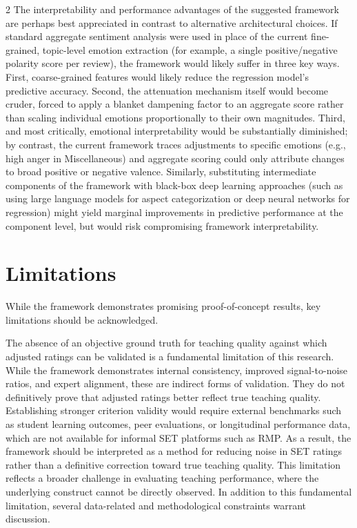 \documentclass{article}
\begin{document}
\begin{multicols*}{2}
The interpretability and performance advantages of the suggested framework are perhaps best appreciated in contrast to alternative architectural choices. If standard aggregate sentiment analysis were used in place of the current fine-grained, topic-level emotion extraction (for example, a single positive/negative polarity score per review), the framework would likely suffer in three key ways. First, coarse-grained features would likely reduce the regression model's predictive accuracy. Second, the attenuation mechanism itself would become cruder, forced to apply a blanket dampening factor to an aggregate score rather than scaling individual emotions proportionally to their own magnitudes. Third, and most critically, emotional interpretability would be substantially diminished; by contrast, the current framework traces adjustments to specific emotions (e.g., high anger in Miscellaneous) and aggregate scoring could only attribute changes to broad positive or negative valence. Similarly, substituting intermediate components of the framework with black-box deep learning approaches (such as using large language models for aspect categorization or deep neural networks for regression) might yield marginal improvements in predictive performance at the component level, but would risk compromising framework interpretability.

\section{Limitations}
While the framework demonstrates promising proof-of-concept results, key limitations should be acknowledged. 

The absence of an objective ground truth for teaching quality against which adjusted ratings can be validated is a fundamental limitation of this research. While the framework demonstrates internal consistency, improved signal-to-noise ratios, and expert alignment, these are indirect forms of validation. They do not definitively prove that adjusted ratings better reflect true teaching quality. Establishing stronger criterion validity would require external benchmarks such as student learning outcomes, peer evaluations, or longitudinal performance data, which are not available for informal SET platforms such as RMP. As a result, the framework should be interpreted as a method for reducing noise in SET ratings rather than a definitive correction toward true teaching quality. This limitation reflects a broader challenge in evaluating teaching performance, where the underlying construct cannot be directly observed. In addition to this fundamental limitation, several data-related and methodological constraints warrant discussion.


\end{multicols*}
\end{document}
